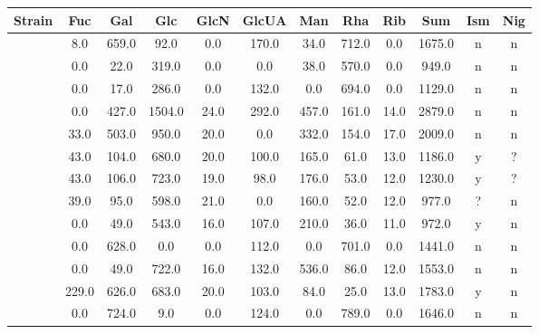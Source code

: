 {\begin{landscape}
\begin{table}
\begin{tabular}{l*{9}{S[table-auto-round]}cc}
				{Strain} & {Fuc} & {Gal} & {Glc} & {GlcN} & {GlcUA} & {Man} & {Rha} & {Rib} & {Sum} & {Ism} & {Nig} \\
				\hline
				 & 8.0 & 659.0 & 92.0 & 0.0 & 170.0 & 34.0 & 712.0 & 0.0 & 1675.0 & n & n \\
				 & 0.0 & 22.0 & 319.0 & 0.0 & 0.0 & 38.0 & 570.0 & 0.0 & 949.0 & n & n \\
				 & 0.0 & 17.0 & 286.0 & 0.0 & 132.0 & 0.0 & 694.0 & 0.0 & 1129.0 & n & n \\
				 & 0.0 & 427.0 & 1504.0 & 24.0 & 292.0 & 457.0 & 161.0 & 14.0 & 2879.0 & n & n \\
				 & 33.0 & 503.0 & 950.0 & 20.0 & 0.0 & 332.0 & 154.0 & 17.0 & 2009.0 & n & n \\
				 & 43.0 & 104.0 & 680.0 & 20.0 & 100.0 & 165.0 & 61.0 & 13.0 & 1186.0 & y & ? \\
				 & 43.0 & 106.0 & 723.0 & 19.0 & 98.0 & 176.0 & 53.0 & 12.0 & 1230.0 & y & ? \\
				 & 39.0 & 95.0 & 598.0 & 21.0 & 0.0 & 160.0 & 52.0 & 12.0 & 977.0 & ? & n \\
				 & 0.0 & 49.0 & 543.0 & 16.0 & 107.0 & 210.0 & 36.0 & 11.0 & 972.0 & y & n \\
				 & 0.0 & 628.0 & 0.0 & 0.0 & 112.0 & 0.0 & 701.0 & 0.0 & 1441.0 & n & n \\
				 & 0.0 & 49.0 & 722.0 & 16.0 & 132.0 & 536.0 & 86.0 & 12.0 & 1553.0 & n & n \\
				 & 229.0 & 626.0 & 683.0 & 20.0 & 103.0 & 84.0 & 25.0 & 13.0 & 1783.0 & y & n \\
				 & 0.0 & 724.0 & 9.0 & 0.0 & 124.0 & 0.0 & 789.0 & 0.0 & 1646.0 & n & n \\
				\bottomrule
			\end{tabular}
		\end{table}
	\end{landscape}
	\clearpage
}

